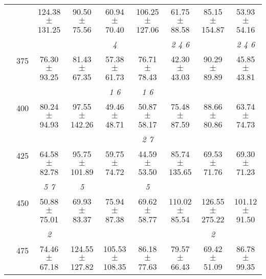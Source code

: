 \begin{table}[h]
{\begin{tabular}{
        ccccccccc}
 & & 124.38 $\pm$ 131.25& 90.50 $\pm$ 75.56& 60.94 $\pm$ 70.40& 106.25 $\pm$ 127.06& 61.75 $\pm$ 88.58& 85.15 $\pm$ 154.87& 53.93 $\pm$ 54.16 \\ 
 & \multirow{2}{*}{375}& \cellcolor[HTML]{EFEFEF} & \cellcolor[HTML]{EFEFEF} & \cellcolor[HTML]{EFEFEF} \textit{ 4 }& \cellcolor[HTML]{EFEFEF} & \cellcolor[HTML]{EFEFEF} \textit{ 2 4 6 }& \cellcolor[HTML]{EFEFEF} & \cellcolor[HTML]{EFEFEF} \textit{ 2 4 6 } \\ 
 & & \cellcolor[HTML]{EFEFEF} 76.30 $\pm$ 93.25& \cellcolor[HTML]{EFEFEF} 81.43 $\pm$ 67.35& \cellcolor[HTML]{EFEFEF} 57.38 $\pm$ 61.73& \cellcolor[HTML]{EFEFEF} 76.71 $\pm$ 78.43& \cellcolor[HTML]{EFEFEF} 42.30 $\pm$ 43.03& \cellcolor[HTML]{EFEFEF} 90.29 $\pm$ 89.89& \cellcolor[HTML]{EFEFEF} 45.85 $\pm$ 43.81 \\ 
 & \multirow{2}{*}{400}& & & \textit{ 1 6 }& \textit{ 1 6 }& & &  \\ 
 & & 80.24 $\pm$ 94.93& 97.55 $\pm$ 142.26& 49.46 $\pm$ 48.71& 50.87 $\pm$ 58.17& 75.48 $\pm$ 87.59& 88.66 $\pm$ 80.86& 63.74 $\pm$ 74.73 \\ 
 & \multirow{2}{*}{425}& \cellcolor[HTML]{EFEFEF} & \cellcolor[HTML]{EFEFEF} & \cellcolor[HTML]{EFEFEF} & \cellcolor[HTML]{EFEFEF} \textit{ 2 7 }& \cellcolor[HTML]{EFEFEF} & \cellcolor[HTML]{EFEFEF} & \cellcolor[HTML]{EFEFEF}  \\ 
 & & \cellcolor[HTML]{EFEFEF} 64.58 $\pm$ 82.78& \cellcolor[HTML]{EFEFEF} 95.75 $\pm$ 101.89& \cellcolor[HTML]{EFEFEF} 59.75 $\pm$ 74.72& \cellcolor[HTML]{EFEFEF} 44.59 $\pm$ 53.50& \cellcolor[HTML]{EFEFEF} 85.74 $\pm$ 135.65& \cellcolor[HTML]{EFEFEF} 69.53 $\pm$ 71.76& \cellcolor[HTML]{EFEFEF} 69.30 $\pm$ 71.23 \\ 
 & \multirow{2}{*}{450}& \textit{ 5 7 }& \textit{ 5 }& & \textit{ 5 }& & &  \\ 
 & & 50.88 $\pm$ 75.01& 69.93 $\pm$ 83.37& 75.94 $\pm$ 87.38& 69.62 $\pm$ 58.77& 110.02 $\pm$ 85.54& 126.55 $\pm$ 275.22& 101.12 $\pm$ 91.50 \\ 
 & \multirow{2}{*}{475}& \cellcolor[HTML]{EFEFEF} \textit{ 2 }& \cellcolor[HTML]{EFEFEF} & \cellcolor[HTML]{EFEFEF} & \cellcolor[HTML]{EFEFEF} & \cellcolor[HTML]{EFEFEF} & \cellcolor[HTML]{EFEFEF} \textit{ 2 }& \cellcolor[HTML]{EFEFEF}  \\ 
 & & \cellcolor[HTML]{EFEFEF} 74.46 $\pm$ 67.18& \cellcolor[HTML]{EFEFEF} 124.55 $\pm$ 127.82& \cellcolor[HTML]{EFEFEF} 105.53 $\pm$ 108.35& \cellcolor[HTML]{EFEFEF} 86.18 $\pm$ 77.63& \cellcolor[HTML]{EFEFEF} 79.57 $\pm$ 66.43& \cellcolor[HTML]{EFEFEF} 69.42 $\pm$ 51.09& \cellcolor[HTML]{EFEFEF} 86.78 $\pm$ 99.35 \\ 

\end{tabular}}
\end{table}
